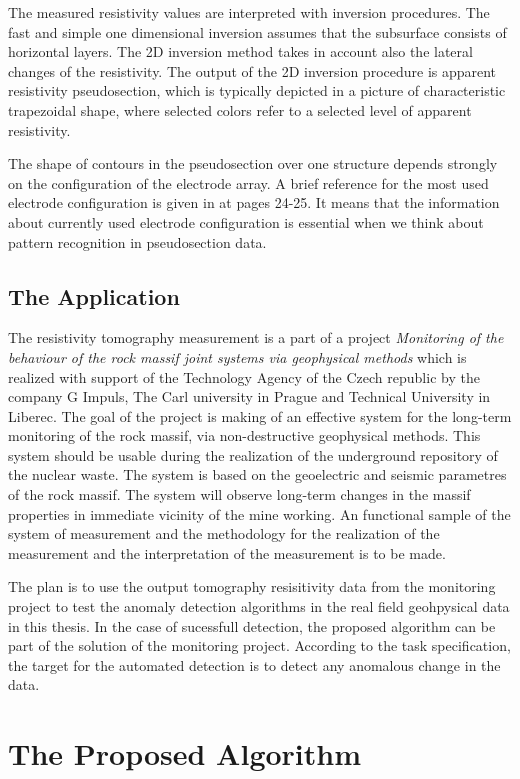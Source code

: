 \documentclass[FM]{tulthesis}
\begin{document}
The measured resistivity values are interpreted with inversion procedures. The fast and simple one dimensional inversion assumes that the subsurface consists of horizontal layers. The 2D inversion method takes in account also the lateral changes of the resistivity. The output of the 2D inversion procedure is apparent resistivity pseudosection, which is typically depicted in a picture of characteristic trapezoidal shape, where selected colors refer to a selected level of apparent resistivity.

The shape of contours in the pseudosection over one structure depends strongly on the configuration of the electrode array. A brief reference for the most used electrode configuration is given in \cite{Loke} at pages 24-25. It means that the information about currently used electrode configuration is essential when we think about pattern recognition in pseudosection data. 

\subsection{The Application}
The resistivity tomography measurement is a part of a project \emph{Monitoring of the behaviour of the rock massif joint systems via geophysical methods} which is realized with support of the Technology Agency of the Czech republic by the company G Impuls, The Carl university in Prague and Technical University in Liberec. The goal of the project is making of an effective system for the long-term monitoring of the rock massif, via non-destructive geophysical methods. This system should be usable during the realization of the underground repository of the nuclear waste. The system is  based on the geoelectric and seismic parametres of the rock massif. The system will observe long-term changes in the massif properties in immediate vicinity of the mine working. An functional sample of the system of measurement and the methodology for the realization of the measurement and the interpretation of the measurement is to be made.

The plan is to use the output tomography resisitivity data from the monitoring project to test the anomaly detection algorithms in the real field geohpysical data in this thesis. In the case of sucessfull detection, the proposed algorithm can be part of the solution of the monitoring project. According to the task specification, the target for the automated detection is to detect any anomalous change in the data. 

\section{The Proposed Algorithm} \label{sec:GraviAlgorithm}
\end{document}
